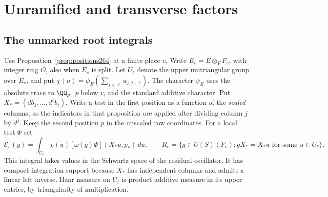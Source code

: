 \documentclass[a4paper,11pt]{article}
\theoremstyle{definition}
\theoremstyle{remark}
\numberwithin{equation}{section}
\begin{document}
\section{Unramified and transverse factors}\label{nav:g-IX-4}

\subsection{The unmarked root integrals}\label{nav:III-45}
Use Proposition~\ref{prop:positions264} at a finite place \(v\).
Write \(E_v=E\otimes_F F_v\), with integer ring \(O\), also
when \(E_v\) is split. Let \(U_\ell\) denote the upper
unitriangular group over \(E_v\), and put
\(\chi(u)=\psi_E(\sum_{j<\ell}u_{j,j+1})\). The character
\(\psi_E\) uses the absolute trace to \(\QQ_p\), \(p\) below
\(v\), and the standard additive character. Put
\(X_*=(d b_1,\ldots,d^\ell b_\ell)\). Write a test in the first
position as a function of the \emph{scaled} columns, so the
indicators in that proposition are applied after dividing
column \(j\) by \(d^j\). Keep the second position \(p\)
in the unscaled row coordinates. For a local test \(\Phi\) set
\[
   \mathcal E_v(g)=
      \int_{U_\ell}\overline{\chi(u)}
         [\omega(g)\Phi](X_*u,p_*)\,du,\qquad
   R_v=\{g\in U(S)(F_v):gX_*=X_*u\text{ for some }u\in U_\ell\}.
\]
This integral takes values in the Schwartz space of the
residual oscillator. It has compact integration support
because \(X_*\) has independent columns and admits a linear
left inverse. Haar measure on \(U_\ell\) is product additive
measure in its upper entries, by triangularity of multiplication.
\end{document}
